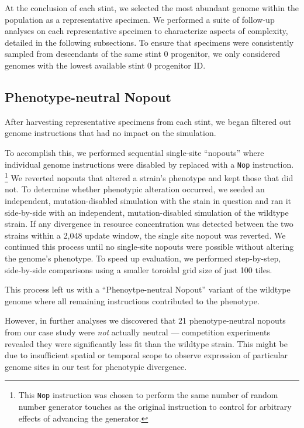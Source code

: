 At the conclusion of each stint, we selected the most abundant genome within the population as a representative specimen.
We performed a suite of follow-up analyses on each representative specimen to characterize aspects of complexity, detailed in the following subsections.
To ensure that specimens were consistently sampled from descendants of the same stint 0 progenitor, we only considered genomes with the lowest available stint 0 progenitor ID.

\subsection{Phenotype-neutral Nopout}

After harvesting representative specimens from each stint, we began filtered out genome instructions that had no impact on the simulation.

To accomplish this, we performed sequential single-site ``nopouts'' where individual genome instructions were disabled by replaced with a \texttt{Nop} instruction.
\footnote{
This \texttt{Nop} instruction was chosen to perform the same number of random number generator touches as the original instruction to control for arbitrary effects of advancing the generator.
}
We reverted nopouts that altered a strain's phenotype and kept those that did not.
To determine whether phenotypic alteration occurred, we seeded an independent, mutation-disabled simulation with the stain in question and ran it side-by-side with an independent, mutation-disabled simulation of the wildtype strain.
If any divergence in resource concentration was detected between the two strains within a 2,048 update window, the single site nopout was reverted.
We continued this process until no single-site nopouts were possible without altering the genome's phenotype.
To speed up evaluation, we performed step-by-step, side-by-side comparisons using a smaller toroidal grid size of just 100 tiles.

This process left us with a ``Phenoytpe-neutral Nopout'' variant of the wildtype genome where all remaining instructions contributed to the phenotype.

However, in further analyses we discovered that 21 phenotype-neutral nopouts from our case study were \textit{not} actually neutral --- competition experiments revealed they were significantly less fit than the wildtype strain.
This might be due to insufficient spatial or temporal scope to observe expression of particular genome sites in our test for phenotypic divergence.

